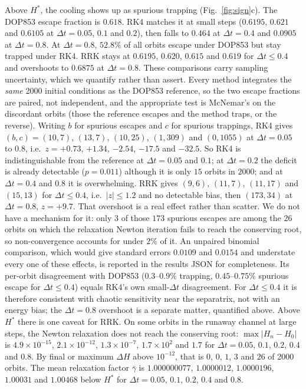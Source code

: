 \documentclass[11pt,a4paper]{article}
\theoremstyle{definition}
\newcommand{\Hs}{H^{*}}
\begin{document}
Above $\Hs$, the cooling shows up as spurious trapping (Fig.~\ref{fig:sign}c). The DOP853 escape fraction is $0.618$. RK4 matches it at small steps ($0.6195$, $0.621$ and $0.6105$ at $\Delta t=0.05$, $0.1$ and $0.2$), then falls to $0.464$ at $\Delta t=0.4$ and $0.0905$ at $\Delta t=0.8$. At $\Delta t=0.8$, $52.8\%$ of all orbits escape under DOP853 but stay trapped under RK4. RRK stays at $0.6195$, $0.620$, $0.615$ and $0.619$ for $\Delta t\le0.4$ and overshoots to $0.6875$ at $\Delta t=0.8$. These comparisons carry sampling uncertainty, which we quantify rather than assert. Every method integrates the \emph{same} 2000 initial conditions as the DOP853 reference, so the two escape fractions are paired, not independent, and the appropriate test is McNemar's on the discordant orbits (those the reference escapes and the method traps, or the reverse). Writing $b$ for spurious escapes and $c$ for spurious trappings, RK4 gives $(b,c)=(10,7)$, $(13,7)$, $(10,25)$, $(1,309)$ and $(0,1055)$ at $\Delta t=0.05$ to $0.8$, i.e.\ $z=+0.73$, $+1.34$, $-2.54$, $-17.5$ and $-32.5$. So RK4 is indistinguishable from the reference at $\Delta t=0.05$ and $0.1$; at $\Delta t=0.2$ the deficit is already detectable ($p=0.011$) although it is only $15$ orbits in $2000$; and at $\Delta t=0.4$ and $0.8$ it is overwhelming. RRK gives $(9,6)$, $(11,7)$, $(11,17)$ and $(15,13)$ for $\Delta t\le0.4$, i.e.\ $|z|\le1.2$ and no detectable bias, then $(173,34)$ at $\Delta t=0.8$, $z=+9.7$. That overshoot is a real effect rather than scatter. We do not have a mechanism for it: only $3$ of those $173$ spurious escapes are among the $26$ orbits on which the relaxation Newton iteration fails to reach the conserving root, so non-convergence accounts for under $2\%$ of it. An unpaired binomial comparison, which would give standard errors $0.0109$ and $0.0154$ and understate every one of these effects, is reported in the results JSON for completeness. Its per-orbit disagreement with DOP853 ($0.3$--$0.9\%$ trapping, $0.45$--$0.75\%$ spurious escape for $\Delta t\le0.4$) equals RK4's own small-$\Delta t$ disagreement. For $\Delta t\le0.4$ it is therefore consistent with chaotic sensitivity near the separatrix, not with an energy bias; the $\Delta t=0.8$ overshoot is a separate matter, quantified above. Above $\Hs$ there is one caveat for RRK. On some orbits in the runaway channel at large steps, the Newton relaxation does not reach the conserving root: $\max|H_n-H_0|$ is $4.9\times10^{-15}$, $2.1\times10^{-12}$, $1.3\times10^{-7}$, $1.7\times10^{2}$ and $1.7$ for $\Delta t=0.05$, $0.1$, $0.2$, $0.4$ and $0.8$. By final or maximum $\Delta H$ above $10^{-12}$, that is $0$, $0$, $1$, $3$ and $26$ of 2000 orbits. The mean relaxation factor $\bar\gamma$ is $1.000000077$, $1.0000012$, $1.0000196$, $1.00031$ and $1.00468$ below $\Hs$ for $\Delta t=0.05$, $0.1$, $0.2$, $0.4$ and $0.8$.
\end{document}
